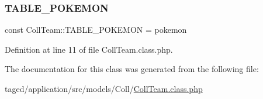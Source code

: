 \subsubsection{\texorpdfstring{T\+A\+B\+L\+E\+\_\+\+P\+O\+K\+E\+M\+ON}{TABLE\_POKEMON}}
{\footnotesize\ttfamily const Coll\+Team\+::\+T\+A\+B\+L\+E\+\_\+\+P\+O\+K\+E\+M\+ON = \textquotesingle{}pokemon\textquotesingle{}}



Definition at line 11 of file Coll\+Team.\+class.\+php.



The documentation for this class was generated from the following file\+:\begin{DoxyCompactItemize}
\item 
taged/application/src/models/\+Coll/\hyperlink{_coll_team_8class_8php}{Coll\+Team.\+class.\+php}\end{DoxyCompactItemize}
